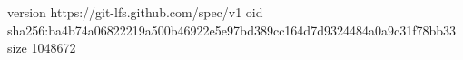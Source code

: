 version https://git-lfs.github.com/spec/v1
oid sha256:ba4b74a06822219a500b46922e5e97bd389cc164d7d9324484a0a9c31f78bb33
size 1048672
